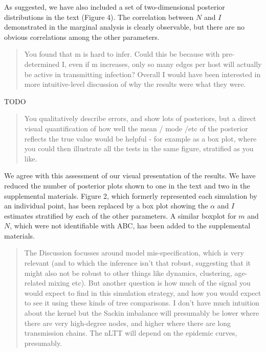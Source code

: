 \documentclass[12pt]{letter}
\begin{document}
\begin{letter}{ }
As suggested, we have also included a set of two-dimensional posterior
distributions in the text (Figure 4). The correlation between $N$ and $I$
demonstrated in the marginal analysis is clearly observable, but there are no
obvious correlations among the other parameters.

\begin{quote}
  \itshape

  You found that m is hard to infer. Could this be because with pre-determined
  I, even if m increases, only so many edges per host will actually be active
  in transmitting infection? Overall I would have been interested in more
  intuitive-level discussion of why the results were what they were.
\end{quote}

  TODO

\begin{quote}
  \itshape

  You qualitatively describe errors, and show lots of posteriors, but a direct
  visual quantification of how well the mean / mode /etc of the posterior
  reflects the true value would be helpful - for example as a box plot, where
  you could then illustrate all the tests in the same figure, stratified as you
  like.
\end{quote}

We agree with this assessment of our visual presentation of the results. We
have reduced the number of posterior plots shown to one in the text and two in
the supplemental materials. Figure 2, which formerly represented each
simulation by an individual point, has been replaced by a box plot showing the
$\alpha$ and $I$ estimates stratified by each of the other parameters. A
similar boxplot for $m$ and $N$, which were not identifiable with ABC, has been
added to the supplemental materials.

\begin{quote}
  \itshape

  The Discussion focusses around model mis-specification, which is very
  relevant (and to which the inference isn't that robust, suggesting that it
  might also not be robust to other things like dynamics, clustering,
  age-related mixing etc). But another question is how much of the signal you
  would expect to find in this simulation strategy, and how you would expect to
  see it using these kinds of tree comparisons. I don't have much intuition
  about the kernel but the Sackin imbalance will presumably be lower where
  there are very high-degree nodes, and higher where there are long
  transmission chains. The nLTT will depend on the epidemic curves, presumably.
\end{quote}


\end{letter}
\end{document}
